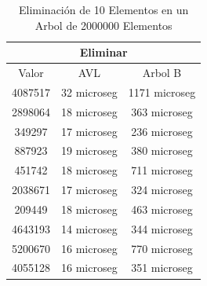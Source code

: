 \documentclass[acmsmall]{acmart}
\begin{document}
\begin{table}[htbp]
\begin{center}
  \caption{Eliminación de 10 Elementos en un Arbol de 2000000 Elementos}
  \begin{tabular}{ccc}
    \toprule
    \multicolumn{3}{c}{Eliminar}\\
    \midrule
     Valor & AVL & Arbol B\\
4087517&32 microseg&1171 microseg\\

2898064&18 microseg&363 microseg\\

349297&17 microseg&236 microseg\\

887923&19 microseg&380 microseg\\

451742&18 microseg&711 microseg\\

2038671&17 microseg&324 microseg\\

209449&18 microseg&463 microseg\\

4643193&14 microseg&344 microseg\\

5200670&16 microseg&770 microseg\\

4055128&16 microseg&351 microseg\\


    \bottomrule
  \end{tabular}
  \end{center}
\end{table}
\end{document}
